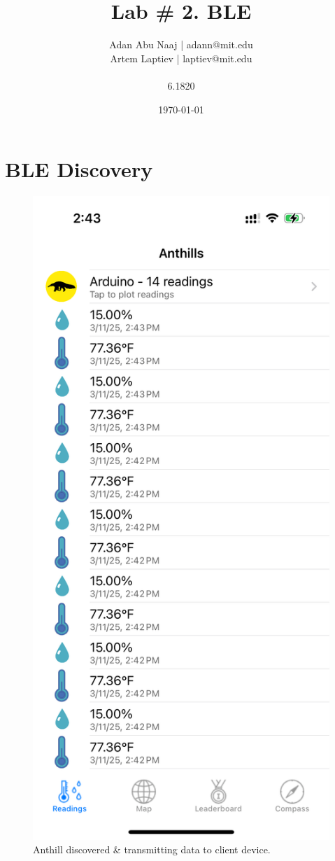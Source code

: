 \documentclass{lab}
\title{Lab \# 2. BLE} %
\author{Adan Abu Naaj | adann@mit.edu \\ Artem Laptiev | laptiev@mit.edu \\\\ 6.1820} %
\date{\today} %
\begin{document}
\maketitle

\newpage

\section{BLE Discovery}


\begin{figure}[h]
    \begin{center}
    \includegraphics[height=0.45\textheight]{images/anthill.png} 
    \caption{Anthill discovered & transmitting data to client device.}
    \end{center}
\end{figure}
\end{document}
